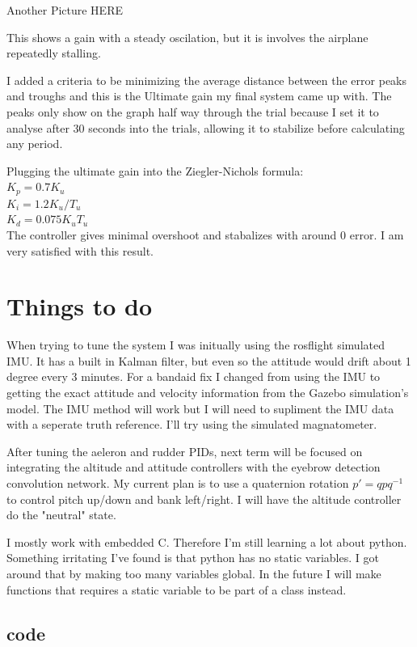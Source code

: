 \documentclass[11pt]{scrartcl} %
\begin{document}
Another Picture HERE

This shows a gain with a steady oscilation, but it is involves the airplane repeatedly stalling.

I added a criteria to be minimizing the average distance between the error peaks and troughs and this is the Ultimate gain my final system came up with. The peaks only show on the graph half way through the trial because I set it to analyse after 30 seconds into the trials, allowing it to stabilize before calculating any period.

Plugging the ultimate gain into the Ziegler-Nichols formula:
\\
$K_p = 0.7K_u$
\\
$K_i = 1.2K_u/T_u$
\\
$K_d = 0.075K_uT_u$
\\
The controller gives minimal overshoot and stabalizes with around 0 error. I am very satisfied with this result.

\section{Things to do}
When trying to tune the system I was initually using the rosflight simulated IMU. It has a built in Kalman filter, but even so the attitude would drift about 1 degree every 3 minutes. For a bandaid fix I changed from using the IMU to getting the exact attitude and velocity information from the Gazebo simulation's model. The IMU method will work but I will need to supliment the IMU data with a seperate truth reference. I'll try using the simulated magnatometer.

After tuning the aeleron and rudder PIDs, next term will be focused on integrating the altitude and attitude controllers with the eyebrow detection convolution network. My current plan is to use a quaternion rotation $p'=qpq^{-1}$ to control pitch up/down and bank left/right. I will have the altitude controller do the "neutral" state.

I mostly work with embedded C. Therefore I'm still learning a lot about python. Something irritating I've found is that python has no static variables. I got around that by making too many variables global. In the future I will make functions that requires a static variable to be part of a class instead.

\subsection{code}
\end{document}
